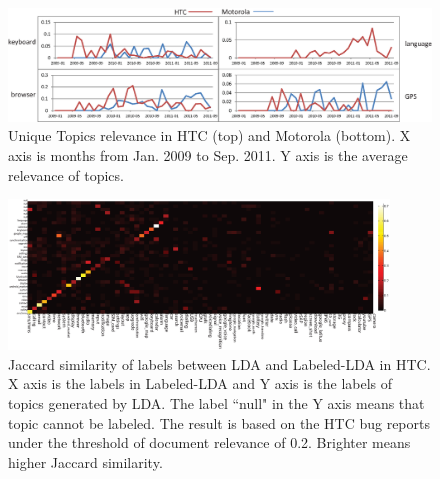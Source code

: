 \documentclass[10pt, conference, compsocconf]{IEEEtran}
\begin{document}
\begin{figure}
\centering
\includegraphics[width=1\textwidth]{uniquetopic.eps}
\caption{Unique Topics relevance in HTC (top) and Motorola (bottom). X axis is months from Jan. 2009 to Sep. 2011. Y axis is the average relevance of topics.}
\label{uniquehtc}
\label{uniquemoto}
\end{figure}


\begin{figure}
\centering
\includegraphics[width=0.9\textwidth]{htcsim.eps}
\caption{Jaccard similarity of labels between LDA and Labeled-LDA in HTC. X axis is the labels in Labeled-LDA and Y axis is the labels of topics generated by LDA. The label ``null" in the Y axis means that topic cannot be labeled. The result is based on the HTC bug reports under the threshold of document relevance of 0.2. Brighter means higher Jaccard similarity.}
\label{similarityhtc}
\end{figure}
\end{document}
